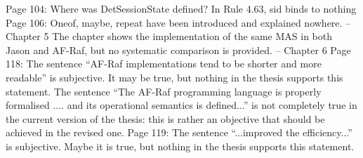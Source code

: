\documentclass{article}
\begin{document}
Page 104:
Where was DetSessionState defined?
In Rule 4.63, sid binds to nothing
Page 106:
Oneof, maybe, repeat have been introduced and explained nowhere.
-- Chapter 5
The chapter shows the implementation of the same MAS in both Jason and AF-Raf, but no systematic
comparison is provided.
-- Chapter 6
Page 118:
The sentence “AF-Raf implementations tend to be shorter and more readable” is subjective. It may
be true, but nothing in the thesis supports this statement.
The sentence “The AF-Raf programming language is properly formalised .... and its operational
semantics is defined...” is not completely true in the current version of the thesis: this is rather an
objective that should be achieved in the revised one.
Page 119:
The sentence “...improved the efficiency...” is subjective. Maybe it is true, but nothing in the thesis
supports this statement.
\end{document}
